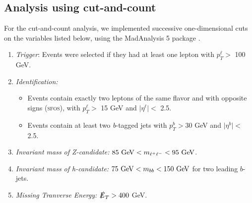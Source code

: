 \documentclass[a4paper,11pt]{article}
\providecommand{\tightlist}{%
     \setlength{\itemsep}{0pt}\setlength{\parskip}{0pt}}
\newcommand{\met}{{\slashed{E}_T}}
\begin{document}
\subsection{Analysis using cut-and-count}
\label{event-selection}

For the cut-and-count analysis, we implemented successive one-dimensional cuts
on the variables listed below, using the MadAnalysis 5 package
\citep{Conte:2012fm}.

\begin{enumerate}
  \tightlist
  \item \emph{Trigger}: Events were selected if they had at least one lepton
    with $p_{T}^\ell >$ 100 GeV. 

  \item \emph{Identification:}

    \begin{itemize}
      \item Events contain exactly two leptons of the same flavor
        and with opposite signs (\textsc{sfos}), with $p_{T}^\ell >$ 15 GeV and
        $\vert\eta^\ell\vert <$ 2.5.
      \item Events contain at least two \emph{b}-tagged jets with
        $p_{T}^b > 30$ GeV and $\vert\eta^b\vert <$ 2.5.
    \end{itemize}

  \item \emph{Invariant mass of Z-candidate:}  $85\ {\rm GeV}<m_{\ell^{+}\ell^{-}}<95\ {\rm GeV}$.

  \item \emph{Invariant mass of h-candidate:} $75\ {\rm GeV}<m_{bb}<150\ {\rm GeV}$ for two leading $b$-jets.

  \item \emph{Missing Tranverse Energy:}  $\met> 400$ GeV.


\end{enumerate}
\end{document}
